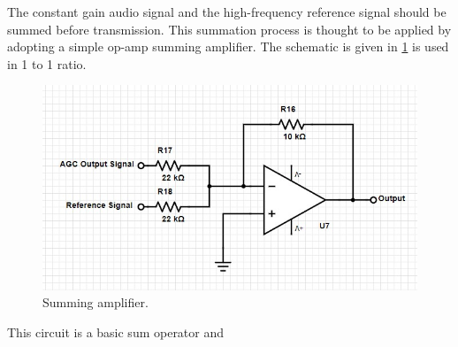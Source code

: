 \documentclass[a4paper,10pt]{IEEEtran}
\begin{document}
The constant gain audio signal and the high-frequency reference signal should be summed before transmission. This summation process is thought to be applied by adopting a simple op-amp summing amplifier.  The schematic is given in \ref{summing} is used in 1 to 1 ratio.
\begin{figure}[htbp!]
    \centering
    \includegraphics[width = 1\linewidth]{Summing Amplifier.jpg}
    \caption{Summing amplifier.}
    \label{summing}
\end{figure} 
This circuit is a basic sum operator and 
\end{document}
